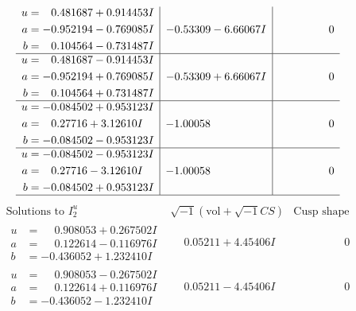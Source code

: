 \documentclass[1p]{elsarticle_modified}
\theoremstyle{definition}
\newcommand{\I}{\sqrt{-1}}
\begin{document}
$$\begin{array}{c|c|c}
\begin{aligned}
u &= \phantom{-}0.481687 + 0.914453 I \\
a &= -0.952194 - 0.769085 I \\
b &= \phantom{-}0.104564 - 0.731487 I\end{aligned}
 & -0.53309 - 6.66067 I & \phantom{-0.000000 } 0 \\ \hline\begin{aligned}
u &= \phantom{-}0.481687 - 0.914453 I \\
a &= -0.952194 + 0.769085 I \\
b &= \phantom{-}0.104564 + 0.731487 I\end{aligned}
 & -0.53309 + 6.66067 I & \phantom{-0.000000 } 0 \\ \hline\begin{aligned}
u &= -0.084502 + 0.953123 I \\
a &= \phantom{-}0.27716 + 3.12610 I \\
b &= -0.084502 - 0.953123 I\end{aligned}
 & -1.00058\phantom{ +0.000000I} & \phantom{-0.000000 } 0 \\ \hline\begin{aligned}
u &= -0.084502 - 0.953123 I \\
a &= \phantom{-}0.27716 - 3.12610 I \\
b &= -0.084502 + 0.953123 I\end{aligned}
 & -1.00058\phantom{ +0.000000I} & \phantom{-0.000000 } 0\\
 \hline 
 \end{array}$$\newpage$$\begin{array}{c|c|c}  
\text{Solutions to }I^u_{2}& \I (\text{vol} + \sqrt{-1}CS) & \text{Cusp shape}\\
 \hline 
\begin{aligned}
u &= \phantom{-}0.908053 + 0.267502 I \\
a &= \phantom{-}0.122614 - 0.116976 I \\
b &= -0.436052 + 1.232410 I\end{aligned}
 & \phantom{-}0.05211 + 4.45406 I & \phantom{-0.000000 } 0 \\ \hline\begin{aligned}
u &= \phantom{-}0.908053 - 0.267502 I \\
a &= \phantom{-}0.122614 + 0.116976 I \\
b &= -0.436052 - 1.232410 I\end{aligned}
 & \phantom{-}0.05211 - 4.45406 I & \phantom{-0.000000 } 0 \\ \hline\begin{aligned}

\end{aligned}
\end{array}$$
\end{document}
